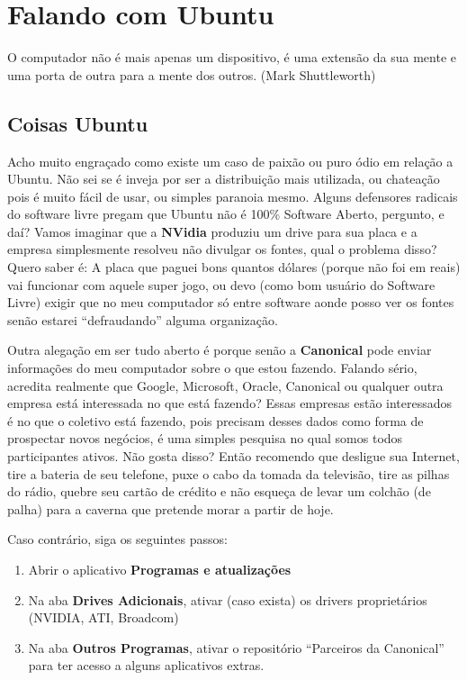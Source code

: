 \chapter{Falando com Ubuntu}

\begin{remark}
O computador não é mais apenas um dispositivo, é uma extensão da sua mente e uma porta de outra para a mente dos outros. (Mark Shuttleworth) 
\end{remark}

\section{Coisas Ubuntu}
Acho muito engraçado como existe um caso de paixão ou puro ódio em relação a Ubuntu. Não sei se é inveja por ser a distribuição mais utilizada, ou chateação pois é muito fácil de usar, ou simples paranoia mesmo. Alguns defensores radicais do software livre pregam que Ubuntu não é 100\% Software Aberto, pergunto, e daí? Vamos imaginar que a \textbf{NVidia} produziu um drive para sua placa e a empresa simplesmente resolveu não divulgar os fontes, qual o problema disso? Quero saber é: A placa que paguei bons quantos dólares (porque não foi em reais) vai funcionar com aquele super jogo, ou devo (como bom usuário do Software Livre) exigir que no meu computador só entre software aonde posso ver os fontes senão estarei ``defraudando'' alguma organização.

Outra alegação em ser tudo aberto é porque senão a \textbf{Canonical} pode enviar informações do meu computador sobre o que estou fazendo. Falando sério, acredita realmente que Google, Microsoft, Oracle, Canonical ou qualquer outra empresa está interessada no que está fazendo? Essas empresas estão interessados é no que o coletivo está fazendo, pois precisam desses dados como forma de prospectar novos negócios, é uma simples pesquisa no qual somos todos participantes ativos. Não gosta disso? Então recomendo que desligue sua Internet, tire a bateria de seu telefone, puxe o cabo da tomada da televisão, tire as pilhas do rádio, quebre seu cartão de crédito e não esqueça de levar um colchão (de palha) para a caverna que pretende morar a partir de hoje.

Caso contrário, siga os seguintes passos: \vspace{-1em}
\begin{enumerate}[noitemsep]
 \item Abrir o aplicativo \textbf{Programas e atualizações}
 \item Na aba \textbf{Drives Adicionais}, ativar (caso exista) os drivers proprietários (NVIDIA, ATI, Broadcom)
 \item Na aba \textbf{Outros Programas}, ativar o repositório ``Parceiros da Canonical'' para ter acesso a alguns aplicativos extras.
\end{enumerate}

